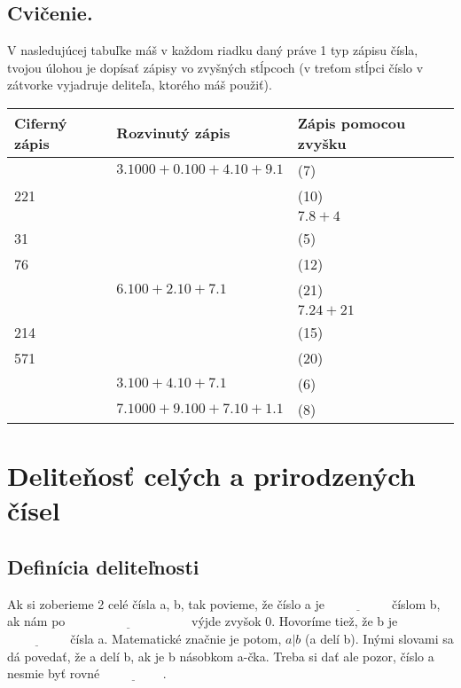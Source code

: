 \documentclass[12pt]{article}
\begin{document}
	\subsection{Cvičenie.} V nasledujúcej tabuľke máš v každom riadku daný práve 1 typ zápisu čísla, tvojou úlohou je dopísať zápisy vo zvyšných stĺpcoch (v treťom stĺpci číslo v zátvorke vyjadruje deliteľa, ktorého máš použiť).\newline
	
	\begin{table}[!hbt]
		
		\begin{tabular}{|l|l|l|}
			\hline
			Ciferný zápis& Rozvinutý zápis& Zápis pomocou zvyšku\\
			\hline
			&$3.1000 + 0.100 + 4.10 + 9.1$&(7) \\
			\hline
			221& &(10)\\
			\hline
			& & $7.8 + 4$\\
			\hline
			31& &(5)\\
			\hline
			76& &(12)\\
			\hline
			&$6.100 + 2.10 + 7.1$&(21)\\
			\hline
			& &$7.24 + 21$\\
			\hline
			214& &(15)\\
			\hline
			571& &(20)\\
			\hline
			&$3.100 + 4.10 + 7.1$ &(6)\\
			\hline
			&$7.1000 + 9.100 + 7.10 + 1.1$&(8)\\
			\hline
		\end{tabular}
	\end{table}
	
	\newpage
	\section{Deliteňosť celých a prirodzených čísel}
	
	\subsection{Definícia deliteľnosti}
	Ak si zoberieme 2 celé čísla a, b, tak povieme, že číslo a je $\underline{\hspace{2cm}}$ číslom b, ak nám po $\underline{\hspace{4cm}}$ výjde zvyšok 0. Hovoríme tiež, že b je $\underline{\hspace{2cm}}$ čísla a. Matematické značnie je potom, $a|b$ (a delí b). Inými slovami sa dá povedať, že a delí b, ak je b násobkom a-čka.\newline
	Treba si dať ale pozor, číslo a nesmie byť rovné $\underline{\hspace{2cm}}$.
	
\end{document}
